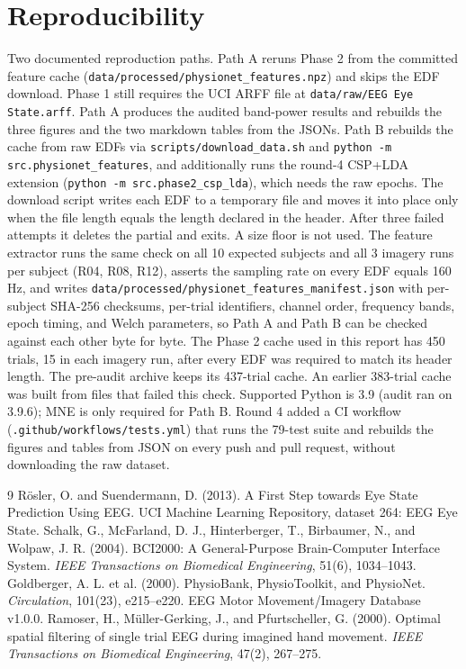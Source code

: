 \documentclass[11pt]{article}
\begin{document}
\section*{Reproducibility}
{\sloppy
Two documented reproduction paths. Path A reruns Phase 2 from the committed feature cache (\texttt{data/\allowbreak processed/\allowbreak physionet\_features.npz}) and skips the EDF download. Phase 1 still requires the UCI ARFF file at \texttt{data/raw/EEG Eye State.arff}. Path A produces the audited band-power results and rebuilds the three figures and the two markdown tables from the JSONs. Path B rebuilds the cache from raw EDFs via \texttt{scripts/download\_data.sh} and \texttt{python -m src.physionet\_features}, and additionally runs the round-4 CSP+LDA extension (\texttt{python -m src.phase2\_csp\_lda}), which needs the raw epochs. The download script writes each EDF to a temporary file and moves it into place only when the file length equals the length declared in the header. After three failed attempts it deletes the partial and exits. A size floor is not used. The feature extractor runs the same check on all 10 expected subjects and all 3 imagery runs per subject (R04, R08, R12), asserts the sampling rate on every EDF equals 160 Hz, and writes \texttt{data/\allowbreak processed/\allowbreak physionet\_\allowbreak features\_\allowbreak manifest.json} with per-subject SHA-256 checksums, per-trial identifiers, channel order, frequency bands, epoch timing, and Welch parameters, so Path A and Path B can be checked against each other byte for byte. The Phase 2 cache used in this report has 450 trials, 15 in each imagery run, after every EDF was required to match its header length. The pre-audit archive keeps its 437-trial cache. An earlier 383-trial cache was built from files that failed this check. Supported Python is 3.9 (audit ran on 3.9.6); MNE is only required for Path B. Round 4 added a CI workflow (\texttt{.github/\allowbreak workflows/\allowbreak tests.yml}) that runs the 79-test suite and rebuilds the figures and tables from JSON on every push and pull request, without downloading the raw dataset.
\par}

\begin{thebibliography}{9}
\small
{} R\"osler, O. and Suendermann, D. (2013). A First Step towards Eye State Prediction Using EEG. UCI Machine Learning Repository, dataset 264: EEG Eye State.
 Schalk, G., McFarland, D. J., Hinterberger, T., Birbaumer, N., and Wolpaw, J. R. (2004). BCI2000: A General-Purpose Brain-Computer Interface System. \textit{IEEE Transactions on Biomedical Engineering}, 51(6), 1034--1043.
 Goldberger, A. L. et al. (2000). PhysioBank, PhysioToolkit, and PhysioNet. \textit{Circulation}, 101(23), e215--e220. EEG Motor Movement/Imagery Database v1.0.0.
 Ramoser, H., M\"uller-Gerking, J., and Pfurtscheller, G. (2000). Optimal spatial filtering of single trial EEG during imagined hand movement. \textit{IEEE Transactions on Biomedical Engineering}, 47(2), 267--275.
\end{thebibliography}
\end{document}
